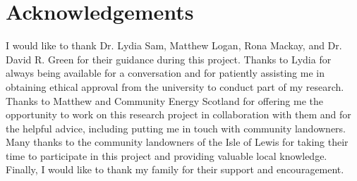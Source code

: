 \chapter{Acknowledgements}

I would like to thank Dr. Lydia Sam, Matthew Logan, Rona Mackay, and Dr. David
R. Green for their guidance during this project. Thanks to Lydia for always
being available for a conversation and for patiently assisting me in obtaining
ethical approval from the university to conduct part of my research. Thanks to
Matthew and Community Energy Scotland for offering me the opportunity to work
on this research project in collaboration with them and for the helpful advice,
including putting me in touch with community landowners. Many thanks to the
community landowners of the Isle of Lewis for taking their time to participate
in this project and providing valuable local knowledge. Finally, I would like
to thank my family for their support and encouragement.
